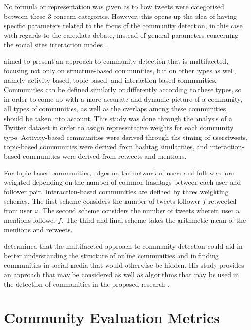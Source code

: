 No formula or representation was given as to how tweets were categorized between these 3 concern categories. However, this opens up the idea of having specific parameters related to the focus of the community detection, in this case with regards to the care.data debate, instead of general parameters concerning the social site\vtick s interaction modes \cite{Amor:2015}.

 aimed to present an approach to community detection that is multifaceted, focusing not only on structure-based communities, but on other types as well, namely activity-based, topic-based, and interaction based communities. Communities can be defined similarly or differently according to these types, so in order to come up with a more accurate and dynamic picture of a community, all types of communities, as well as the overlaps among these communities, should be taken into account. This study was done through the analysis of a Twitter dataset in order to assign representative weights for each community type. Activity-based communities were derived through the timing of users\vtick tweets, topic-based communities were derived from hashtag similarities, and interaction-based communities were derived from retweets and mentions. 

For topic-based communities, edges on the network of users and followers are weighted depending on the number of common hashtags between each user and follower pair. Interaction-based communities are defined by three weighting schemes. The first scheme considers the number of tweets follower $f$ retweeted from user $u$. The second scheme considers the number of tweets wherein user $u$ mentions follower $f$. The third and final scheme takes the arithmetic mean of the mentions and retweets.

 determined that the multifaceted approach to community detection could aid in better understanding the structure of online communities and in finding communities in social media that would otherwise be hidden. His study provides an approach that may be considered as well as algorithms that may be used in the detection of communities in the proposed research \cite{Darmon:2015}.

\section{Community Evaluation Metrics}


